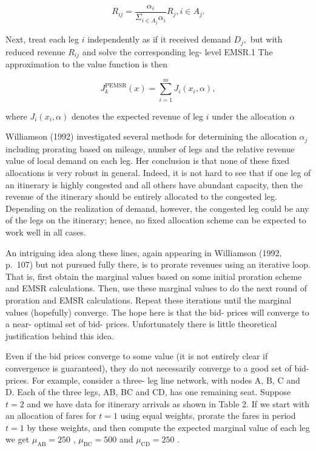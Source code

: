 \[
R_{ij} = \frac{\alpha_i}{\Sigma_{i\in A_j}\alpha_i} R_{j}, i\in A_j.
\]

Next, treat each leg \(i\) independently as if it received demand
\(D_{j},\) but with reduced revenue \(R_{ij}\) and solve the
corresponding leg- level EMSR.1 The approximation to the value function
is then

\[
J_{k}^{\mathrm{PEMSR}}(x) = \sum_{i = 1}^{m}J_{i}(x_{i},\alpha),
\]

where \(J_{i}(x_{i},\alpha)\) denotes the expected revenue of leg \(i\)
under the allocation \(\alpha\)

Williamson (1992) investigated several methods for determining the
allocation \(\alpha_{j}\) including prorating based on mileage, number
of legs and the relative revenue value of local demand on each leg. Her
conclusion is that none of these fixed allocations is very robust in
general. Indeed, it is not hard to see that if one leg of an itinerary
is highly congested and all others have abundant capacity, then the
revenue of the itinerary should be entirely allocated to the congested
leg. Depending on the realization of demand, however, the congested leg
could be any of the legs on the itinerary; hence, no fixed allocation
scheme can be expected to work well in all cases.

An intriguing idea along these lines, again appearing in Williamson
(1992, p.~107) but not pursued fully there, is to prorate revenues using
an iterative loop. That is, first obtain the marginal values based on
some initial proration scheme and EMSR calculations. Then, use these
marginal values to do the next round of proration and EMSR calculations.
Repeat these iterations until the marginal values (hopefully) converge.
The hope here is that the bid- prices will converge to a near- optimal
set of bid- prices. Unfortunately there is little theoretical
justification behind this idea.

Even if the bid prices converge to some value (it is not entirely clear
if convergence is guaranteed), they do not necessarily converge to a
good set of bid- prices. For example, consider a three- leg line
network, with nodes A, B, C and D. Each of the three legs, AB, BC and
CD, has one remaining seat. Suppose \(t = 2\) and we have data for
itinerary arrivals as shown in Table 2. If we start with an allocation
of fares for \(t = 1\) using equal weights, prorate the fares in period
\(t = 1\) by these weights, and then compute the expected marginal value
of each leg we get \(\mu_{\mathrm{AB}} = 250\) ,
\(\mu_{\mathrm{BC}} = 500\) and \(\mu_{\mathrm{CD}} = 250\) .

